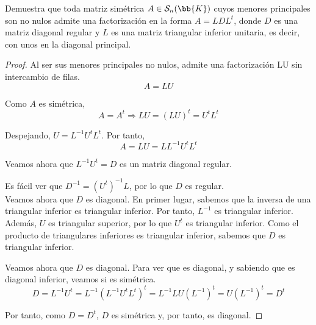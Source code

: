 \begin{ejercicio}
    Demuestra que toda matriz simétrica $A\in \mathcal{S}_n(\bb{K})$ cuyos menores principales son no nulos admite una factorización en la forma $A = LDL^t$, donde $D$ es una matriz diagonal regular y $L$ es una matriz triangular inferior unitaria, es decir, con unos en la diagonal principal.

    \begin{proof}
        Al ser sus menores principales no nulos, admite una factorización LU sin intercambio de filas. $$A=LU$$

        Como $A$ es simétrica, $$A=A^t \Longrightarrow LU = (LU)^t = U^tL^t$$
    
        Despejando, $U=L^{-1}U^tL^t$. Por tanto,
        $$A=LU=LL^{-1}U^tL^t$$
    
        Veamos ahora que $L^{-1}U^t = D$ es un matriz diagonal regular.
        
        Es fácil ver que $D^{-1}=(U^t)^{-1}L$, por lo que $D$ es regular. \\
        
        Veamos ahora que $D$ es diagonal.
        En primer lugar, sabemos que la inversa de una triangular inferior es triangular inferior. Por tanto, $L^{-1}$ es triangular inferior.
        Además, $U$ es triangular superior, por lo que $U^t$ es triangular inferior.
        Como el producto de triangulares inferiores es triangular inferior, sabemos que $D$ es triangular inferior.
    
        Veamos ahora que $D$ es diagonal. Para ver que es diagonal, y sabiendo que es diagonal inferior, veamos si es simétrica.
        $$D = L^{-1}U^t = L^{-1}(L^{-1}U^tL^t)^t = L^{-1}LU(L^{-1})^t = U(L^{-1})^t = D^t$$
        
        Por tanto, como $D=D^t$, $D$ es simétrica y, por tanto, es diagonal.
    \end{proof}
    
\end{ejercicio}

